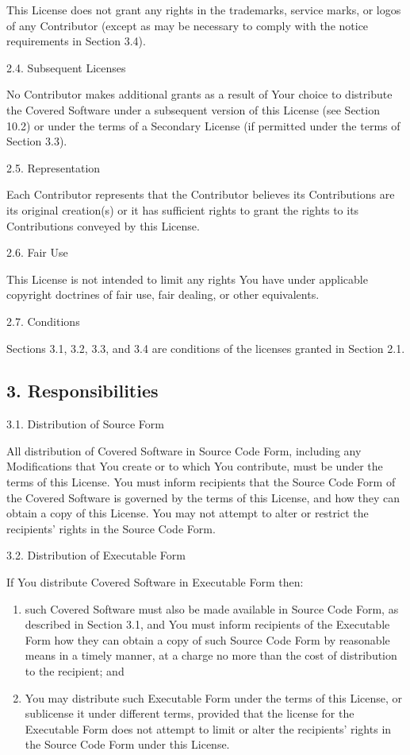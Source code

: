 \documentclass[letterpaper,10pt,english]{sphinxmanual}
\begin{document}
This License does not grant any rights in the trademarks, service marks,
or logos of any Contributor (except as may be necessary to comply with
the notice requirements in Section 3.4).

2.4. Subsequent Licenses

No Contributor makes additional grants as a result of Your choice to
distribute the Covered Software under a subsequent version of this
License (see Section 10.2) or under the terms of a Secondary License (if
permitted under the terms of Section 3.3).

2.5. Representation

Each Contributor represents that the Contributor believes its
Contributions are its original creation(s) or it has sufficient rights
to grant the rights to its Contributions conveyed by this License.

2.6. Fair Use

This License is not intended to limit any rights You have under
applicable copyright doctrines of fair use, fair dealing, or other
equivalents.

2.7. Conditions

Sections 3.1, 3.2, 3.3, and 3.4 are conditions of the licenses granted
in Section 2.1.


\subsection{3. Responsibilities}
\label{\detokenize{warranty:responsibilities}}
3.1. Distribution of Source Form

All distribution of Covered Software in Source Code Form, including any
Modifications that You create or to which You contribute, must be under
the terms of this License. You must inform recipients that the Source
Code Form of the Covered Software is governed by the terms of this
License, and how they can obtain a copy of this License. You may not
attempt to alter or restrict the recipients’ rights in the Source Code
Form.

3.2. Distribution of Executable Form

If You distribute Covered Software in Executable Form then:
\begin{enumerate}
\item {} 
such Covered Software must also be made available in Source Code
Form, as described in Section 3.1, and You must inform recipients of
the Executable Form how they can obtain a copy of such Source Code
Form by reasonable means in a timely manner, at a charge no more
than the cost of distribution to the recipient; and

\item {} 
You may distribute such Executable Form under the terms of this
License, or sublicense it under different terms, provided that the
license for the Executable Form does not attempt to limit or alter
the recipients’ rights in the Source Code Form under this License.

\end{enumerate}
\end{document}
